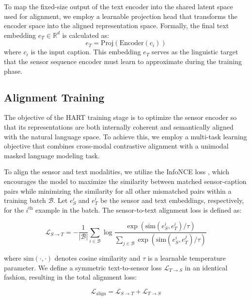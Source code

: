 To map the fixed-size output of the text encoder into the shared latent space used for alignment, we employ a learnable projection head that transforms the encoder space into the aligned representation space. Formally, the final text embedding $e_T \in \mathbb{R}^d$ is calculated as:
\begin{equation}
e_T = \text{Proj}(\text{Encoder}(c_i))
\end{equation}
where $c_i$ is the input caption. This embedding $e_T$ serves as the linguistic target that the sensor sequence encoder must learn to approximate during the training phase.


\subsection{Alignment Training}
\label{sec:contrastive_alignment}

The objective of the HART training stage is to optimize the sensor encoder so that its representations are both internally coherent and semantically aligned with the natural language space. To achieve this, we employ a multi-task learning objective that combines cross-modal contrastive alignment with a unimodal masked language modeling task.

To align the sensor and text modalities, we utilize the InfoNCE loss \cite{oord2019representation}, which encourages the model to maximize the similarity between matched sensor-caption pairs while minimizing the similarity for all other mismatched pairs within a training batch $\mathcal{B}$. Let $e_S^i$ and $e_T^i$ be the sensor and text embeddings, respectively, for the $i^{\text{th}}$ example in the batch. The sensor-to-text alignment loss is defined as:

\begin{equation}
    \mathcal{L}_{S\rightarrow T} = -\frac{1}{|\mathcal{B}|} \sum_{i \in \mathcal{B}} \log \frac{\exp(\text{sim}(e_S^i, e_T^i) / \tau)}{\sum_{j \in \mathcal{B}} \exp(\text{sim}(e_S^i, e_T^j) / \tau)}
    \label{eq:loss_st}
\end{equation}

where $\text{sim}(\cdot, \cdot)$ denotes cosine similarity and $\tau$ is a learnable temperature parameter. We define a symmetric text-to-sensor loss $\mathcal{L}_{T\rightarrow S}$ in an identical fashion, resulting in the total alignment loss:

\begin{equation}
    \mathcal{L}_{\text{align}} = \mathcal{L}_{S\rightarrow T} + \mathcal{L}_{T\rightarrow S}
\end{equation}

